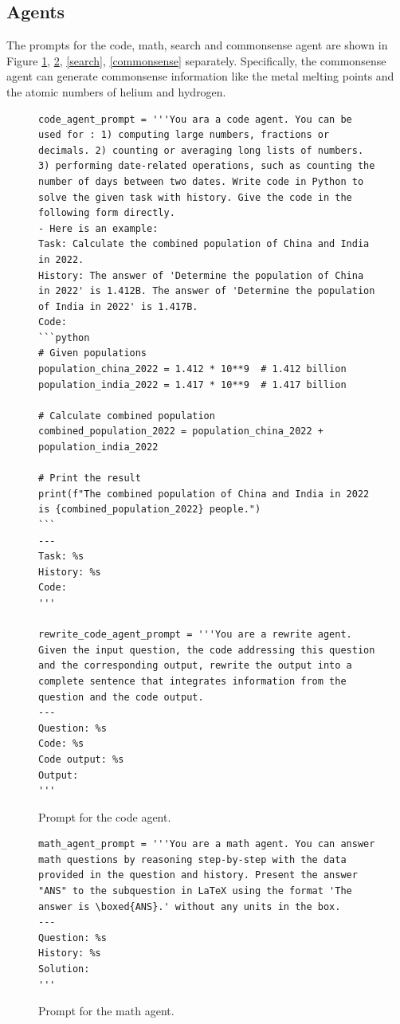 \subsection{Agents}
The prompts for the code, math, search and commonsense agent are shown in Figure \ref{code}, \ref{math}, \ref{search}, \ref{commonsense} separately. Specifically, the commonsense agent can generate commonsense information like the metal melting points and the atomic numbers of helium and hydrogen.
\label{agents}
\begin{figure}[H]
\centering
\begin{lstlisting}[frame=single, basicstyle=\scriptsize\ttfamily, breaklines=true]
code_agent_prompt = '''You ara a code agent. You can be used for : 1) computing large numbers, fractions or decimals. 2) counting or averaging long lists of numbers. 3) performing date-related operations, such as counting the number of days between two dates. Write code in Python to solve the given task with history. Give the code in the following form directly. 
- Here is an example: 
Task: Calculate the combined population of China and India in 2022.
History: The answer of 'Determine the population of China in 2022' is 1.412B. The answer of 'Determine the population of India in 2022' is 1.417B.
Code:
```python
# Given populations
population_china_2022 = 1.412 * 10**9  # 1.412 billion
population_india_2022 = 1.417 * 10**9  # 1.417 billion

# Calculate combined population
combined_population_2022 = population_china_2022 + population_india_2022

# Print the result
print(f"The combined population of China and India in 2022 is {combined_population_2022} people.")
```
---
Task: %s
History: %s
Code:
'''

rewrite_code_agent_prompt = '''You are a rewrite agent. Given the input question, the code addressing this question and the corresponding output, rewrite the output into a complete sentence that integrates information from the question and the code output.
---
Question: %s
Code: %s
Code output: %s
Output:
'''
\end{lstlisting}
\caption{Prompt for the code agent.}
\label{code}
\end{figure}

\begin{figure}[H]
\centering
\begin{lstlisting}[frame=single, basicstyle=\scriptsize\ttfamily, breaklines=true]
math_agent_prompt = '''You are a math agent. You can answer math questions by reasoning step-by-step with the data provided in the question and history. Present the answer "ANS" to the subquestion in LaTeX using the format 'The answer is \boxed{ANS}.' without any units in the box.
---
Question: %s
History: %s
Solution: 
'''
\end{lstlisting}
\caption{Prompt for the math agent.}
\label{math}
\end{figure}

